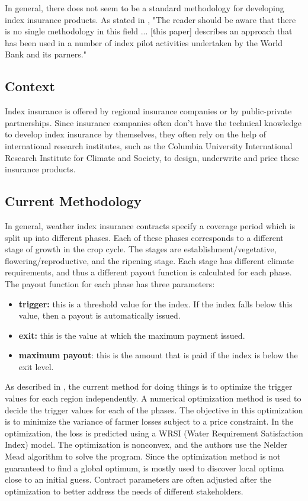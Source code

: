 \documentclass[11pt]{article}
\begin{document}
    In general, there does not seem to be a standard methodology for developing index insurance products. As stated in \cite{world2011weather}, "The reader should be aware that there is no single methodology in this field ... [this paper] describes an approach that has been used in a number of index pilot activities undertaken by the World Bank and its parners." 

  \subsection{Context}
    Index insurance is offered by regional insurance companies or by public-private partnerships. Since insurance companies often don't have the technical knowledge to develop index insurance by themselves, they often rely on the help of international research institutes, such as the Columbia University International Research Institute for Climate and Society, to design, underwrite and price these insurance products. 

  
  \subsection{Current Methodology}
    In general, weather index insurance contracts specify a coverage period which is split up into different phases. Each of these phases corresponds to a different stage of growth in the crop cycle. The stages are establishment/vegetative, flowering/reproductive, and the ripening stage. Each stage has different climate requirements, and thus a different payout function is calculated for each phase. The payout function for each phase has three parameters: 
    \begin{itemize}
      \item \textbf{trigger:} this is a threshold value for the index. If the index falls below this value, then a payout is automatically issued. 
      \item \textbf{exit:} this is the value at which the maximum payment issued. 
      \item \textbf{maximum payout}: this is the amount that is paid if the index is below the exit level. 
    \end{itemize}

    As described in \cite{world2011weather}, the current method for doing things is to optimize the trigger values for each region independently. A numerical optimization method is used to decide the trigger values for each of the phases. The objective in this optimization is to minimize the variance of farmer losses subject to a price constraint. In the optimization, the loss is predicted using a WRSI (Water Requirement Satisfaction Index) model. The optimization is nonconvex, and the authors use the Nelder Mead algorithm to solve the program. Since the optimization method is not guaranteed to find a global optimum, is mostly used to discover local optima close to an initial guess. Contract parameters are often adjusted after the optimization to better address the needs of different stakeholders.
\end{document}
